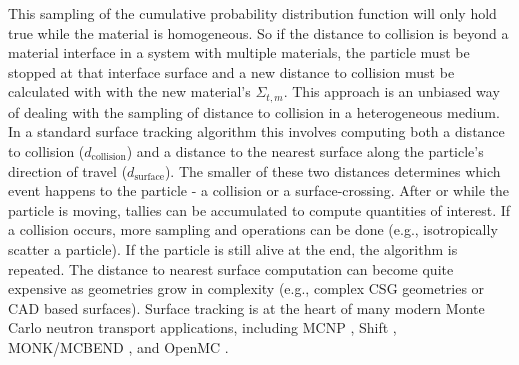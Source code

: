 This sampling of the cumulative probability distribution function will only hold true while the material is homogeneous.
So if the distance to collision is beyond a material interface in a system with multiple materials, the particle must be stopped at that interface surface and a new distance to collision must be calculated with with the new material's $\Sigma_{t,m}$.
This approach is an unbiased way of dealing with the sampling of distance to collision in a heterogeneous medium.
In a standard surface tracking algorithm this involves computing both a distance to collision ($d_{\text{collision}}$) and a distance to the nearest surface along the particle's direction of travel ($d_{\text{surface}}$).
The smaller of these two distances determines which event happens to the particle - a collision or a surface-crossing.
After or while the particle is moving, tallies can be accumulated to compute quantities of interest.
If a collision occurs, more sampling and operations can be done (e.g., isotropically scatter a particle).
If the particle is still alive at the end, the algorithm is repeated.
The distance to nearest surface computation can become quite expensive as geometries grow in complexity (e.g., complex CSG geometries or CAD based surfaces).
Surface tracking is at the heart of many modern Monte Carlo neutron transport applications, including MCNP \cite{MCNP_RisingArmstrongEtAl}, Shift \cite{hamilton_continuous-energy_2019, pandya_implementation_2016}, MONK/MCBEND \cite{richards_monk_2015}, and OpenMC \cite{romano_openmc_2015}.


